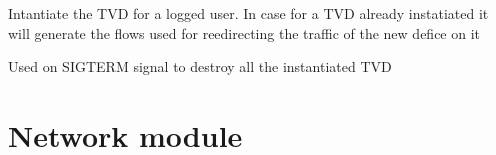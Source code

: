 \documentclass[letterpaper,10pt,oneside]{sphinxmanual}
\begin{document}
\begin{fulllineitems}
\begin{fulllineitems}
\label{GraphInstatiator:GraphInstatiator.GraphInstantiator.instatiateTVD}
Intantiate the TVD for a logged user.
In case for a TVD already instatiated it will generate the flows used for reedirecting the traffic of the new defice on it

\end{fulllineitems}


\begin{fulllineitems}
\label{GraphInstatiator:GraphInstatiator.GraphInstantiator.signal_term_handler}
Used on SIGTERM signal to destroy all the instantiated TVD

\end{fulllineitems}


\end{fulllineitems}



\chapter{Network module}
\label{Network:module-Network}\label{Network::doc}\label{Network:network-module}
\end{document}
